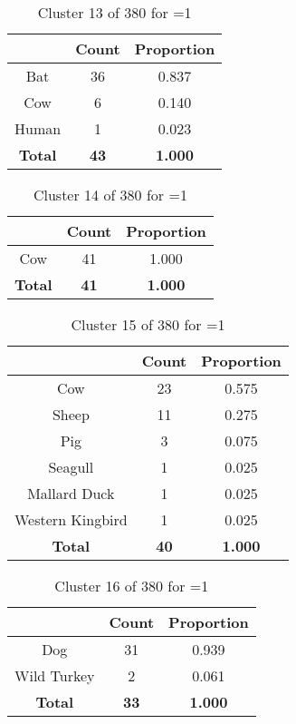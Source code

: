 \begin{table}[ht!]
\centering
\begin{tabular}{|c|c|c|}
\hline
\bf \Spec{} &\bf Count &\bf Proportion\\ \hline \hline
Bat & 36 & 0.837\\ \hline
Cow & 6 & 0.140\\ \hline
Human & 1 & 0.023\\ \hline
\hline
\bf Total & \bf 43 & \bf 1.000\\ \hline
\end{tabular}
\label{tab:cluster:13:1}
\caption{Cluster 13 of 380 for \minneigh{}=1}
\end{table}

\begin{table}[ht!]
\centering
\begin{tabular}{|c|c|c|}
\hline
\bf \Spec{} &\bf Count &\bf Proportion\\ \hline \hline
Cow & 41 & 1.000\\ \hline
\hline
\bf Total & \bf 41 & \bf 1.000\\ \hline
\end{tabular}
\label{tab:cluster:14:1}
\caption{Cluster 14 of 380 for \minneigh{}=1}
\end{table}

\begin{table}[ht!]
\centering
\begin{tabular}{|c|c|c|}
\hline
\bf \Spec{} &\bf Count &\bf Proportion\\ \hline \hline
Cow & 23 & 0.575\\ \hline
Sheep & 11 & 0.275\\ \hline
Pig & 3 & 0.075\\ \hline
Seagull & 1 & 0.025\\ \hline
Mallard Duck & 1 & 0.025\\ \hline
Western Kingbird & 1 & 0.025\\ \hline
\hline
\bf Total & \bf 40 & \bf 1.000\\ \hline
\end{tabular}
\label{tab:cluster:15:1}
\caption{Cluster 15 of 380 for \minneigh{}=1}
\end{table}

\begin{table}[ht!]
\centering
\begin{tabular}{|c|c|c|}
\hline
\bf \Spec{} &\bf Count &\bf Proportion\\ \hline \hline
Dog & 31 & 0.939\\ \hline
Wild Turkey & 2 & 0.061\\ \hline
\hline
\bf Total & \bf 33 & \bf 1.000\\ \hline
\end{tabular}
\label{tab:cluster:16:1}
\caption{Cluster 16 of 380 for \minneigh{}=1}
\end{table}

